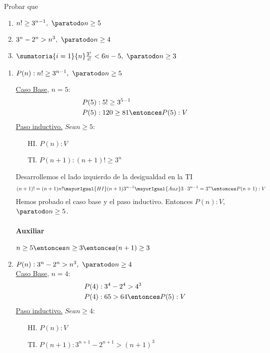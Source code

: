 \begin{enunciado}{\ejercicio}
  Probar que
  \begin{enumerate}[label=\roman*)]
    \item $n! \geq 3^{n-1}, \ \paratodo n \geq 5$
    \item $3^n - 2^n > n^3, \ \paratodo n \geq 4$
    \item $ \sumatoria{i=1}{n} \frac{3^i}{i!} < 6n - 5, \ \paratodo n \geq 3$
  \end{enumerate}
\end{enunciado}

\begin{enumerate}[label=\roman*)]
  \item $P(n): n! \geq 3^{n-1}, \ \paratodo n \geq 5$ \par
        \underline{Caso Base}, $n = 5$:
        \begin{align*}
           & P(5): 5! \geq 3^{5-1}             \\
           & P(5): 120 \geq 81 \entonces P(5):V
        \end{align*}
        \underline{Paso inductivo.} $Sea n \geq 5$:
        \begin{enumerate}
          \item[HI.] $P(n): V$
          \item[TI.] $P(n+1): (n+1)! \geq 3^n$
        \end{enumerate}

        Desarrollemos el lado izquierdo de la desigualdad en la TI
        \begin{align*}
                (n+1)! = (n+1)n! \mayorIgual{HI} (n+1)3^{n-1} \mayorIgual{Aux} 3 \cdot 3^{n-1} = 3^n
          \entonces P(n+1):V
        \end{align*}
        Hemos probado el caso base y el paso inductivo. Entonces $P(n):V,$ $\paratodo n \geq 5$.

        \paragraph{Auxiliar}{$n \geq 5 \entonces n \geq 3 \entonces (n+1) \geq 3$}

  \item $P(n): 3^n - 2^n > n^3, \ \paratodo n \geq 4$ \\
        \underline{Caso Base}, $n = 4$:
        \begin{align*}
           & P(4): 3^4 - 2^4 > 4^3         \\
           & P(4): 65 > 64 \entonces P(5):V
        \end{align*}
        \underline{Paso inductivo.} $Sea n \geq 4$:
        \begin{enumerate}
          \item[HI.] $P(n): V$
          \item[TI.] $P(n+1): 3^{n+1} - 2^{n+1} > (n+1)^3$
        \end{enumerate}


\end{enumerate}
